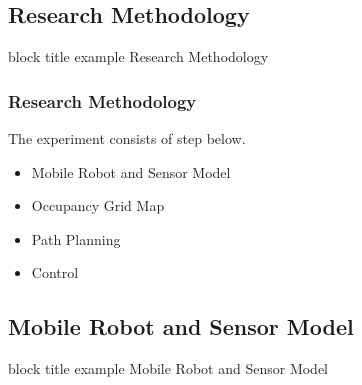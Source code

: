 \begin{frame}
	\section{Research Methodology}
	\begin{beamercolorbox}[rounded=true]{block title example}
		\centering
		\LARGE
		Research Methodology
	\end{beamercolorbox}
\end{frame}


\begin{frame}
	\frametitle{Research Methodology}
	The experiment consists of step below.
	\begin{itemize}
		\item<1-> Mobile Robot and Sensor Model
		\item<2-> Occupancy Grid Map
		\item<3-> Path Planning
		\item<4-> Control
	\end{itemize}
\end{frame}


\begin{frame}
	\subsection{Mobile Robot and Sensor Model}
	\begin{beamercolorbox}[rounded=true]{block title example}
		\centering
		\LARGE
		Mobile Robot and Sensor Model
	\end{beamercolorbox}
\end{frame}


